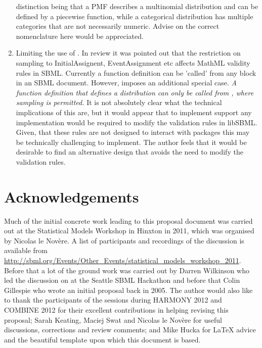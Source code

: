 \documentclass[draftspec]{sbmlpkgspec}
\begin{document}
\begin{enumerate}
  distinction being that a PMF describes a multinomial distribution
  and can be defined by a piecewise function, while a categorical
  distribution has multiple categories that are not necessarily
  numeric. Advise on the correct nomenclature here would be
  appreciated.
\item Limiting the use of . In review it was
  pointed out that the restriction on sampling to InitialAssignent,
  EventAssignment etc affects MathML validity rules in SBML. Currently
  a function definition can be 'called' from any \mathml block in an
  SBML document. However, \distribshort imposes an additional special
  case. \emph{A function definition that defines a distribution can
    only be called from \mathml, where sampling is permitted.} It is
  not absolutely clear what the technical implications of this are,
  but it would appear that to implement \distribshort support any
  implementation would be required to modify the \mathml validation
  rules in libSBML. Given, that these rules are not designed to
  interact with packages this may be technically challenging to
  implement. The author feels that it would be desirable to find an
  alternative design that avoids the need to modify the \mathml
  validation rules.
\end{enumerate}

\section{Acknowledgements}
\label{sec:uncertmlusage}

Much of the initial concrete work leading to this proposal document
was carried out at the Statistical Models Workshop in Hinxton in 2011,
which was organised by Nicolas le Nov\`{e}re. A list of participants
and recordings of the discussion is available from
\url{http://sbml.org/Events/Other_Events/statistical_models_workshop_2011}.
Before that a lot of the ground work was carried out by Darren
Wilkinson who led the discussion on \distribshort at the Seattle SBML
Hackathon and before that Colin Gillespie who wrote an initial
proposal back in 2005. The author would also like to thank the
participants of the \distribshort sessions during HARMONY 2012 and
COMBINE 2012 for their excellent contributions in helping revising
this proposal; Sarah Keating, Maciej Swat and Nicolas le Nov\`{e}re
for useful discussions, corrections and review comments; and Mike
Hucka for \LaTeX{} advice and the beautiful template upon which this
document is based.
\end{document}
